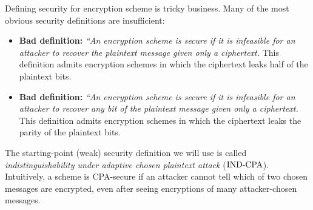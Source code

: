 Defining security for encryption scheme is tricky business.
Many of the most obvious security definitions are insufficient:
\begin{itemize}
  \item \textbf{Bad definition:} \emph{``An encryption scheme is secure 
        if it is infeasible for an attacker to recover the plaintext
        message given only a ciphertext.}
        This definition admits encryption schemes in which the ciphertext
        leaks half of the plaintext bits.
  \item \textbf{Bad definition:} \emph{``An encryption scheme is secure 
        if it is infeasible for an attacker to recover any bit of
        the plaintext message given only a ciphertext.}
        This definition admits encryption schemes in which the ciphertext
        leaks the parity of the plaintext bits.
\end{itemize}

The starting-point (weak) security definition we will use
is called \emph{indistinguishability under adaptive chosen plaintext attack}
($\text{IND-CPA}$).
Intuitively, a scheme is CPA-secure if an attacker cannot tell which of two chosen messages are encrypted, even after seeing encryptions of many attacker-chosen messages.

